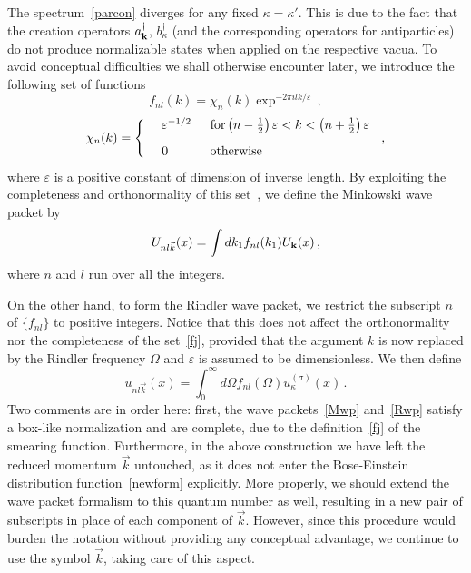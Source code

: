\documentclass[floats,prd,aps,amssymb,nofootinbib,showkeys]{revtex4}
\newcommand{\be}{\begin{equation}}\newcommand{\ee}{\end{equation}}
\begin{document}
The spectrum~\eqref{parcon} diverges
for any fixed $\kappa=\kappa'$. 
This is due to the fact that the creation operators
$a_{{\bf {k}}}^\dagger$, $b_{\kappa}^\dagger$
(and the corresponding operators for
antiparticles) do not produce normalizable
states when applied on the respective vacua.
To avoid conceptual difficulties we shall otherwise 
encounter later, we introduce the following set of functions~\cite{Hawk1995}
\be
\label{fj}
f_{nl}(k)=\chi_n(k)\exp^{-2\pi i l k/\varepsilon}\,,
\ee
\be
\chi_n(k)=\left\{\begin{array}{rcl}
&&\hspace{-4mm}\varepsilon^{-1/2}\,\,\,\,\,\,\,\,\, \mathrm{for} \left(n-\frac{1}{2}\right)\varepsilon<k<\left(n+\frac{1}{2}\right)\varepsilon\\[3mm]
&&\hspace{-4mm}0 \,\,\,\,\,\,\,\,\,\,\,\,\,\,\,\,\,\,\,\,\mathrm{otherwise}
\end{array}\right.\,,
\ee
where $\varepsilon$ is a positive constant of dimension
of inverse length. By exploiting the completeness and orthonormality 
of this set~\cite{Takagi}, we define
the Minkowski wave packet by
\be
\label{Mwp}
U_{n l \vec{k}}(x)=\int dk_1 f_{nl}(k_1)U_{\bk}(x)\,,
\ee
where $n$ and $l$ run over all the integers. 

On the other hand, to form the Rindler wave packet,
we restrict the subscript $n$ of $\{f_{nl}\}$ to 
positive integers. Notice that this 
does not affect the orthonormality nor
the completeness of the set~\eqref{fj}, 
provided that the argument $k$ is now replaced
by the Rindler frequency $\Omega$ and
$\varepsilon$ is assumed to be dimensionless. 
We then define
\be
\label{Rwp}
u_{n l \vec{k}}(x)=\int_{0}^{\infty}d\Omega f_{nl}(\Omega)u^{(\sigma)}_{\kappa}(x)\,. 
\ee
Two comments are in order here: first, the wave packets~\eqref{Mwp}
and~\eqref{Rwp} satisfy a box-like normalization
and are complete, due to the definition~\eqref{fj} of the smearing
function. Furthermore, in the above construction we
have left the reduced momentum $\vec{k}$ untouched, 
as it does not enter the Bose-Einstein distribution function~\eqref{newform}
explicitly. More properly, we should extend
the wave packet formalism to this quantum number as well,  
resulting in a new pair of subscripts in place of each 
component of $\vec{k}$. However, 
since this procedure would burden the
notation without providing any conceptual advantage, 
we continue to use the symbol $\vec{k}$, 
taking care of this aspect.
\end{document}
